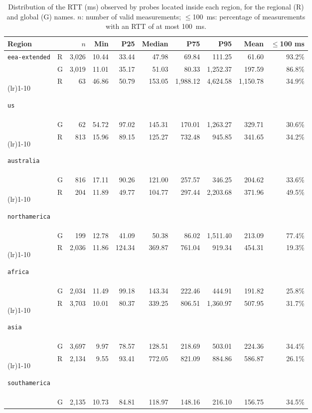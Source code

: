 \documentclass[
A4paper,                %
twoside,                %
openright,              %
chapterprefix=true,     %
12pt,                   %
headings=normal,        %
titlepage=on            %
]{book}
\newcommand{\rowsep}[1]{%
    \arrayrulecolor{black!30}%
    \cmidrule[0.3pt](lr){1-#1}%
    \arrayrulecolor{black}%
}
\begin{document}
\begin{table}[ht]
    \centering
    \footnotesize
    \setlength{\tabcolsep}{4pt}
    \caption{Distribution of the RTT (ms) observed by probes located inside each region, for the regional (R) and global (G) names. $n$: number of valid measurements; $\leq$100~ms: percentage of measurements with an RTT of at most 100~ms.}
    \label{tab:rcadns_rtt_stats}
    \begin{tabular}{llrrrrrrrr}
        \toprule
        \textbf{Region} & & $n$ & \textbf{Min} & \textbf{P25} & \textbf{Median} & \textbf{P75} & \textbf{P95} & \textbf{Mean} & \textbf{$\leq$100 ms} \\
        \midrule
        \texttt{eea-extended}   & R & 3{,}026 & 10.44 & 33.44 & 47.98 & 69.84 & 111.25 & 61.60 & 93.2\% \\
                                & G & 3{,}019 & 11.01 & 35.17 & 51.03 & 80.33 & 1{,}252.37 & 197.59 & 86.8\% \\
        \rowsep{10}
        \texttt{us}             & R & 63 & 46.86 & 50.79 & 153.05 & 1{,}988.12 & 4{,}624.58 & 1{,}150.78 & 34.9\% \\
                                & G & 62 & 54.72 & 97.02 & 145.31 & 170.01 & 1{,}263.27 & 329.71 & 30.6\% \\
        \rowsep{10}
        \texttt{australia}      & R & 813 & 15.96 & 89.15 & 125.27 & 732.48 & 945.85 & 341.65 & 34.2\% \\
                                & G & 816 & 17.11 & 90.26 & 121.00 & 257.57 & 346.25 & 204.62 & 33.6\% \\
        \rowsep{10}
        \texttt{northamerica}   & R & 204 & 11.89 & 49.77 & 104.77 & 297.44 & 2{,}203.68 & 371.96 & 49.5\% \\
                                & G & 199 & 12.78 & 41.09 & 50.38 & 86.02 & 1{,}511.40 & 213.09 & 77.4\% \\
        \rowsep{10}
        \texttt{africa}         & R & 2{,}036 & 11.86 & 124.34 & 369.87 & 761.04 & 919.34 & 454.31 & 19.3\% \\
                                & G & 2{,}034 & 11.49 & 99.18 & 143.34 & 222.46 & 444.91 & 191.82 & 25.8\% \\
        \rowsep{10}
        \texttt{asia}           & R & 3{,}703 & 10.01 & 80.37 & 339.25 & 806.51 & 1{,}360.97 & 507.95 & 31.7\% \\
                                & G & 3{,}697 & 9.97 & 78.57 & 128.51 & 218.69 & 503.01 & 224.36 & 34.4\% \\
        \rowsep{10}
        \texttt{southamerica}   & R & 2{,}134 & 9.55 & 93.41 & 772.05 & 821.09 & 884.86 & 586.87 & 26.1\% \\
                                & G & 2{,}135 & 10.73 & 84.81 & 118.97 & 148.16 & 216.10 & 156.75 & 34.5\% \\
        \bottomrule
    \end{tabular}
\end{table}
\end{document}
